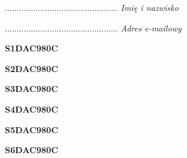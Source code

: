 \begin{turn}{90}\begin{minipage}{\linewidth} \vspace{20mm} ................................................  \textit{Imię i nazwisko}\end{minipage}\end{turn}

\begin{turn}{90}\begin{minipage}{\linewidth} \vspace{20mm} ................................................  \textit{Adres e-mailowy}\end{minipage}\end{turn}

\begin{turn}{90}\huge \begin{minipage}{\linewidth} \vspace{10mm}\textbf{S1DAC980C}\end{minipage}\end{turn}

\begin{turn}{90}\huge \begin{minipage}{\linewidth} \vspace{10mm}\textbf{S2DAC980C}\end{minipage}\end{turn}

\begin{turn}{90}\huge \begin{minipage}{\linewidth} \vspace{10mm}\textbf{S3DAC980C}\end{minipage}\end{turn}

\begin{turn}{90}\huge \begin{minipage}{\linewidth} \vspace{10mm}\textbf{S4DAC980C}\end{minipage}\end{turn}

\begin{turn}{90}\huge \begin{minipage}{\linewidth} \vspace{10mm}\textbf{S5DAC980C}\end{minipage}\end{turn}

\begin{turn}{90}\huge \begin{minipage}{\linewidth} \vspace{10mm}\textbf{S6DAC980C}\end{minipage}\end{turn}


